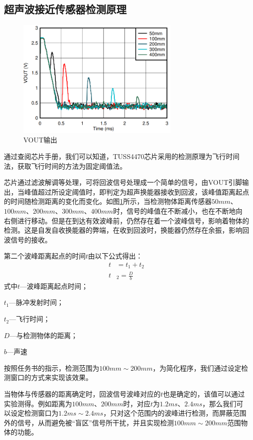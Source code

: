 \subsection{超声波接近传感器检测原理}
\begin{figure}[!h]
	\centering
	\includegraphics[width=8cm]{figure/VOUT image.png}
	\caption{VOUT输出}
	\label{VOUT输出}
\end{figure}\par
通过查阅芯片手册，我们可以知道，TUSS4470芯片采用的检测原理为飞行时间法，获取飞行时间的方法为固定阈值法。\par
芯片通过滤波解调等处理，可将回波信号处理成一个简单的信号，由VOUT引脚输出，当峰值超过所设定阈值时，即判定为超声换能器接收到回波，该峰值距离起点的时间随检测距离的变化而变化。如图\ref{VOUT输出}所示，当检测物体距离传感器$50mm$、$100mm$、$200mm$、$300mm$、$400mm$时，信号的峰值在不断减小，也在不断地向右侧进行移动。但是在到达有效波峰前，仍然存在着一个波峰信号，影响着物体的检测。这是自发自收换能器的弊端，在收到回波时，换能器仍然存在余振，影响回波信号的接收。\par
第二个波峰距离起点的时间$t$由以下公式得出：       
\begin{align}
	t&=t_1+t_2 \\
	t&_2=\frac{D}{b}	
	\label{检测周期公式}
\end{align}  
式中\quad$t$---波峰距离起点时间；\par
\quad$t_1$---脉冲发射时间；\par
\quad$t_2$---飞行时间；\par    
\quad$D$---与检测物体的距离；\par  
\quad$b$---声速\par    
按照任务书的指示，检测范围为$100mm\sim200mm$，为简化程序，我们通过设定检测窗口的方式来实现该效果。\par  
当物体与传感器的距离确定时，回波信号波峰对应的$t$也是确定的，该值可以通过实验测得。例如距离为$100mm$、$200mm$时，对应$t$为$1.2ms$、$2.4ms$，那么我们可以设定检测窗口为$1.2ms\sim2.4ms$，只对这个范围内的波峰进行检测，而屏蔽范围外的信号，从而避免被“盲区”信号所干扰，并且实现检测$100mm\sim200mm$范围物体的功能。\par
